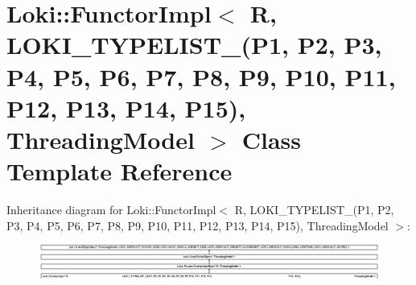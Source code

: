 \hypertarget{classLoki_1_1FunctorImpl_3_01R_00_01_01_01_01_01_01_01_01_01_01_01_01_01_01_01_01_01_01_01_01_01853f8aa60d308affa006585da132e7c8}{}\section{Loki\+:\+:Functor\+Impl$<$ R, L\+O\+K\+I\+\_\+\+T\+Y\+P\+E\+L\+I\+S\+T\+\_(P1, P2, P3, P4, P5, P6, P7, P8, P9, P10, P11, P12, P13, P14, P15), Threading\+Model $>$ Class Template Reference}
\label{classLoki_1_1FunctorImpl_3_01R_00_01_01_01_01_01_01_01_01_01_01_01_01_01_01_01_01_01_01_01_01_01853f8aa60d308affa006585da132e7c8}
Inheritance diagram for Loki\+:\+:Functor\+Impl$<$ R, L\+O\+K\+I\+\_\+\+T\+Y\+P\+E\+L\+I\+S\+T\+\_(P1, P2, P3, P4, P5, P6, P7, P8, P9, P10, P11, P12, P13, P14, P15), Threading\+Model $>$\+:\begin{figure}[H]
\begin{center}
\leavevmode
\includegraphics[height=1.097501cm]{classLoki_1_1FunctorImpl_3_01R_00_01_01_01_01_01_01_01_01_01_01_01_01_01_01_01_01_01_01_01_01_01853f8aa60d308affa006585da132e7c8}
\end{center}
\end{figure}
